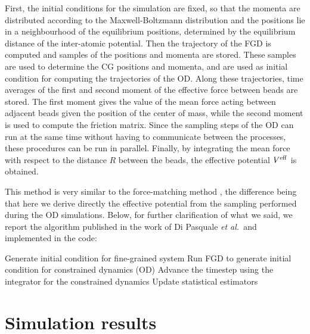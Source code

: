 \documentclass[10pt,a4paper]{book}
\theoremstyle{definition}
\begin{document}
First, the initial conditions for the simulation are fixed, so that the momenta are distributed according to the Maxwell-Boltzmann distribution and the positions lie in a neighbourhood of the equilibrium positions, determined by the equilibrium distance of the inter-atomic potential.
Then the trajectory of the FGD is computed and samples of the positions and momenta are stored. These samples are used to determine the CG positions and momenta, and are used as initial condition for computing the trajectories of the OD. Along these trajectories, time averages of the first and second moment of the effective force between beads are stored. The first moment gives the value of the mean force acting between adjacent beads given the position of the center of mass, while the second moment is used to compute the friction matrix. Since the sampling steps of the OD can run at the same time without having to communicate between the processes, these procedures can be run in parallel. 
Finally, by integrating the mean force with respect to the distance $R$ between the beads, the effective potential $V^{\mathrm{eff}}$ is obtained.

This method is very similar to the force-matching method \cite{Ercolessi1994,Izvekov2004}, the difference being that here we derive directly the effective potential from the sampling performed during the OD simulations.
Below, for further clarification of what we said, we report the algorithm published in the work of Di Pasquale \textit{et al.}~and implemented in the code:
\begin{algorithm} [H]
\caption{Sampling Algorithm \cite{DiPasquale2019}}
\begin{algorithmic}[1]
  \State Generate initial condition for fine-grained system
   \State Run FGD to generate initial condition for constrained dynamics (OD)
   \State Advance the timestep using the integrator for the constrained dynamics
   \State Update statistical estimators
   \EndWhile
   \EndWhile
\EndProcedure
\end{algorithmic}
\end{algorithm}

\chapter{Simulation results}
\end{document}
